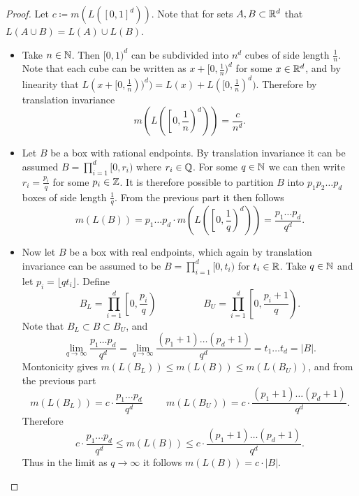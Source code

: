 \documentclass[hw_all.tex]{subfiles}
\begin{document}
\begin{proof}
    Let $c \coloneq m(L([0,1]^d))$. Note that for sets $A, B \subset \mathbb{R}^d$ that $L(A \cup B) = L(A) \cup L(B)$.

    \begin{itemize}
        \item
            Take $n \in \mathbb{N}$. Then $[0,1)^d$ can be subdivided into $n^d$ cubes of side length $\frac{1}{n}$. Note that each cube can be written as $x + [0, \frac{1}{n})^d$ for some $x \in \mathbb{R}^d$, and by linearity that $L(x + [0,\frac{1}{n}))^d) = L(x) + L([0, \frac{1}{n})^d)$. Therefore by translation invariance
            \[
                m\left(L\left(\left[0, \frac{1}{n}\right)^d\right)\right) = \frac{c}{n^d}
            .\]

        \item
            Let $B$ be a box with rational endpoints. By translation invariance it can be assumed $B = \prod_{i=1}^d [0,r_i)$ where $r_i \in \mathbb{Q}$. For some $q \in \mathbb{N}$ we can then write $r_i = \frac{p_i}{q}$ for some $p_i \in \mathbb{Z}$. It is therefore possible to partition $B$ into $p_1 p_2 \ldots p_d$ boxes of side length $\frac{1}{q}$. From the previous part it then follows
            \[
                m(L(B)) = p_1 \ldots p_d \cdot m\left(L\left(\left[0, \frac{1}{q}\right)^d\right)\right) = \frac{p_1 \ldots p_d}{q^d}
            .\]

        \item 
            Now let $B$ be a box with real endpoints, which again by translation invariance can be assumed to be $B = \prod_{i=1}^d [0, t_i)$ for $t_i \in \mathbb{R}$. Take $q \in \mathbb{N}$ and let $p_i = \lfloor q t_i \rfloor$. Define
            \[
                B_L = \prod_{i=1}^d \left[0, \frac{p_i}{q}\right) \hspace{2cm} B_U = \prod_{i=1}^d \left[0, \frac{p_i + 1}{q}\right)
            .\]
            Note that $B_L \subset B \subset B_U$, and
            \[
                \lim_{q \to \infty} \frac{p_1 \ldots p_d}{q^d} = \lim_{q \to \infty} \frac{(p_1 + 1)\ldots (p_d + 1)}{q^d} = t_1 \ldots t_d = |B|
            .\]
            Montonicity gives $m(L(B_L)) \leq m(L(B)) \leq m(L(B_U))$, and from the previous part
            \[
                m(L(B_L)) = c \cdot\frac{p_1 \ldots p_d}{q^d} \hspace{1cm} m(L(B_U)) = c\cdot \frac{(p_1 + 1) \ldots (p_d + 1)}{q^d}
            .\]
            Therefore
            \[
                c \cdot \frac{p_1 \ldots p_d}{q^d} \leq m(L(B)) \leq c \cdot \frac{(p_1 + 1) \ldots (p_d + 1)}{q^d}
            .\]
            Thus in the limit as $q \to \infty$ it follows $m(L(B)) = c \cdot |B|$.
    \end{itemize}


\end{proof}
\end{document}
